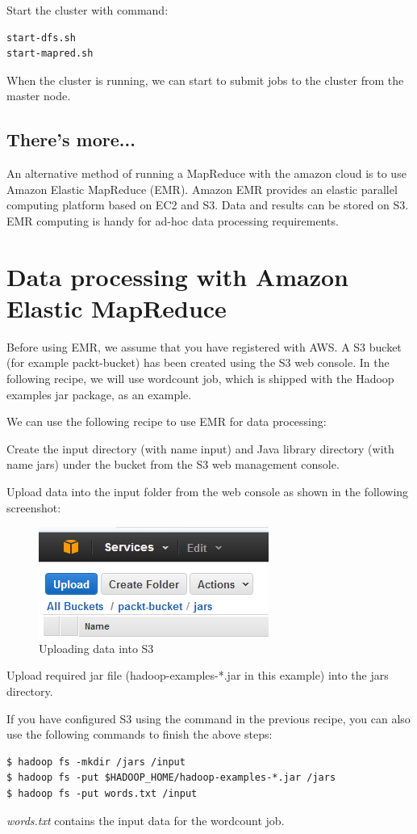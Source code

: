 Start the cluster with command:
\lstset{style=bashstyle}
\begin{lstlisting}
start-dfs.sh
start-mapred.sh
\end{lstlisting}

When the cluster is running, we can start to submit jobs to the cluster from the master node.
\subsection*{There's more...}
An alternative method of running a MapReduce with the amazon cloud is to use Amazon Elastic MapReduce (EMR). Amazon EMR provides an elastic parallel computing platform based on EC2 and S3. Data and results can be stored on S3. EMR computing is handy for ad-hoc data processing requirements.

\section{Data processing with Amazon Elastic MapReduce}
Before using EMR, we assume that you have registered with AWS. A S3 bucket (for example packt-bucket) has been created using the S3 web console. In the following recipe, we will use wordcount job, which is shipped with the Hadoop examples jar package, as an example.

We can use the following recipe to use EMR for data processing:

Create the input directory (with name input) and Java library directory (with name jars) under the bucket from the S3 web management console.

Upload data into the input folder from the web console as shown in the following screenshot:
\begin{figure}[h]
  \centering
  \includegraphics[width=.5\textwidth]{figs/5163os_08_22.png}
  \caption{Uploading data into S3}\label{fig:aws.s3.upload}
\end{figure} 

Upload required jar file (hadoop-examples-*.jar in this example) into the jars directory.

If you have configured S3 using the command in the previous recipe, you can also use the following commands to finish the above steps:
\lstset{style=bashstyle}
\begin{lstlisting}
$ hadoop fs -mkdir /jars /input
$ hadoop fs -put $HADOOP_HOME/hadoop-examples-*.jar /jars
$ hadoop fs -put words.txt /input
\end{lstlisting}
\emph{words.txt} contains the input data for the wordcount job.

